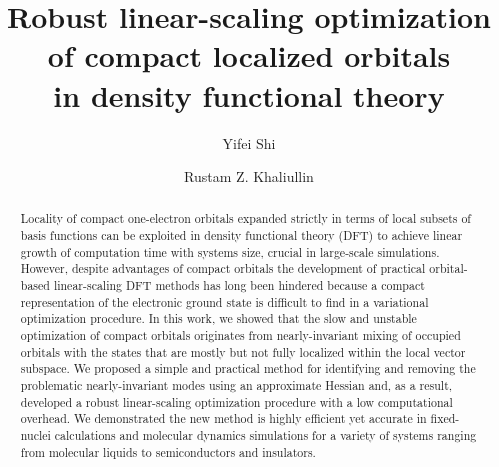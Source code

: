 \documentclass[aps,prl,twocolumn,reprint,amsmath,amssymb]{revtex4-1}
\begin{document}
\newcommand{\Ang}{\ensuremath{\mathring{\text{A}}}}
\newcommand{\ltwid}{\mathrel{\raise.3ex\hbox{$<$\kern-.75em\lower1ex\hbox{$\sim$}}}}
\newcommand{\gtwid}{\mathrel{\raise.3ex\hbox{$>$\kern-.75em\lower1ex\hbox{$\sim$}}}}
\newcommand{\ket}[1]{\ensuremath{\vert #1 \rangle}}
\newcommand{\bra}[1]{\ensuremath{\langle #1 \vert}}
\newcommand{\braket}[2]{\ensuremath{\langle #1 \vert #2 \rangle}} %
\newcommand{\ketbra}[2]{\ensuremath{\vert #1 \rangle \langle #2 \vert}} %
\newcommand{\op}[1]{\ensuremath{\hat{#1}}} %
\newcommand{\sill}{\psi}
\newcommand{\trace}{{\rm Tr}}
\newcommand{\ntilde}{\tilde{n}}
\newcommand{\stilde}{\tilde{s}}
\newcommand{\atilde}{\tilde{\alpha}}
\newcommand{\new}{\color{red}}
\newcommand{\old}{\color{black}}
\newcommand{\bea}{\begin{eqnarray}}
\newcommand{\eea}{\end{eqnarray}}
\newcommand{\br}{\ensuremath{\mathbf{r}}}
\def\nn{\nonumber\\}



\title{Robust linear-scaling optimization of compact localized orbitals\\
in density functional theory}

\author{Yifei Shi}
\author{Rustam Z. Khaliullin}


\begin{abstract} 
Locality of compact one-electron orbitals expanded strictly in terms of local subsets of basis functions can be exploited in density functional theory (DFT) to achieve linear growth of computation time with systems size, crucial in large-scale simulations. However, despite advantages of compact orbitals the development of practical orbital-based linear-scaling DFT methods has long been hindered because a compact representation of the electronic ground state is difficult to find in a variational optimization procedure. In this work, we showed that the slow and unstable optimization of compact orbitals originates from nearly-invariant mixing of occupied orbitals with the states that are mostly but not fully localized within the local vector subspace. We proposed a simple and practical method for identifying and removing the problematic nearly-invariant modes using an approximate Hessian and, as a result, developed a robust linear-scaling optimization procedure with a low computational overhead. We demonstrated the new method is highly efficient yet accurate in fixed-nuclei calculations and molecular dynamics simulations for a variety of systems ranging from molecular liquids to semiconductors and insulators.  
\end{abstract}
\maketitle
\end{document}
